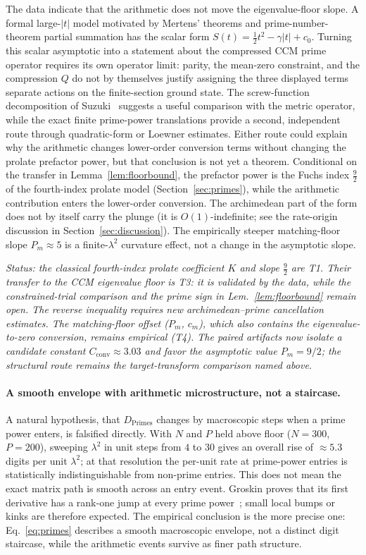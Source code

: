 \documentclass[11pt,a4paper]{article}
\begin{document}
The data indicate that the arithmetic does not move the eigenvalue-floor slope.
A formal large-$|t|$ model motivated by Mertens' theorems and
prime-number-theorem partial summation has the scalar form
$S(t)=\tfrac12 t^2-\gamma|t|+c_0$. Turning this scalar asymptotic into a
statement about the compressed CCM prime operator requires its own operator
limit: parity, the mean-zero constraint, and the compression $Q$ do not by
themselves justify assigning the three displayed terms separate actions on the
finite-section ground state. The screw-function decomposition of
Suzuki~\cite{Suzuki2026} suggests a useful comparison with the metric operator,
while the exact finite prime-power translations provide a second, independent
route through quadratic-form or Loewner estimates. Either route could explain
why the arithmetic changes lower-order conversion terms without changing the
prolate prefactor power, but that conclusion is not yet a theorem. Conditional on the transfer in
Lemma~\ref{lem:floorbound}, the prefactor power is the Fuchs index $\tfrac92$ of
the fourth-index prolate model (Section~\ref{sec:primes}), while the arithmetic
contribution enters the lower-order conversion. The archimedean part of the
form does not by itself carry the
plunge (it is $O(1)$-indefinite; see the rate-origin discussion in
Section~\ref{sec:discussion}). The empirically steeper
matching-floor slope $P_m\approx5$ is a finite-$\lambda^2$ curvature effect, not a
change in the asymptotic slope.

\emph{Status: the classical fourth-index prolate coefficient $K$ and slope
$\tfrac92$ are T1. Their transfer to the CCM eigenvalue floor is T3: it is
validated by the data, while the constrained-trial comparison and the prime
sign in Lem.~\ref{lem:floorbound} remain open. The reverse inequality requires
new archimedean--prime cancellation estimates. The matching-floor offset
($P_m$, $c_m$), which also contains the eigenvalue-to-zero conversion, remains
empirical (T4). The paired artifacts now isolate a candidate constant
$C_{\mathrm{conv}}\approx3.03$ and favor the asymptotic value $P_m=9/2$; the
structural route remains the target-transform comparison named above.}

\paragraph{A smooth envelope with arithmetic microstructure, not a staircase.}
A natural hypothesis, that $D_{\mathrm{Primes}}$ changes by macroscopic steps
when a prime power enters, is falsified directly. With $N$ and $P$ held above
floor ($N=300$, $P=200$), sweeping $\lambda^2$ in unit steps from $4$ to $30$
gives an overall rise of $\approx5.3$ digits per unit $\lambda^2$; at that
resolution the per-unit rate at prime-power entries is statistically
indistinguishable from non-prime entries. This does not mean the exact matrix
path is smooth across an entry event. Groskin proves that its first derivative
has a rank-one jump at every prime power~\cite{GroskinMatrix2026}; small local
bumps or kinks are therefore expected. The empirical conclusion is the more
precise one: Eq.~\eqref{eq:primes} describes a smooth macroscopic envelope, not
a distinct digit staircase, while the arithmetic events survive as finer path
structure.
\end{document}

